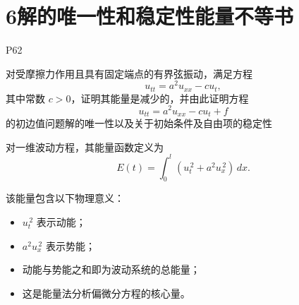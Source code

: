 \section{6解的唯一性和稳定性能量不等书}
P62
\begin{homework}[1]
对受摩擦力作用且具有固定端点的有界弦振动，满足方程
\[
u_{tt}=a^{2}u_{xx}-c u_t,
\]
其中常数 $c>0$，证明其能量是减少的，并由此证明方程
\[
u_{tt}=a^{2}u_{xx}-c u_t+f
\]
的初边值问题解的唯一性以及关于初始条件及自由项的稳定性
\end{homework}
\begin{definition}[波动方程的能量]
对一维波动方程，其能量函数定义为
\[
E(t)=\int_{0}^{l}\left(u_t^{\,2}+a^{2}u_x^{\,2}\right)\,dx.
\]

该能量包含以下物理意义：
\begin{itemize}
    \item $u_t^{\,2}$ 表示动能；
    \item $a^{2}u_x^{\,2}$ 表示势能；
    \item 动能与势能之和即为波动系统的总能量；
    \item 这是能量法分析偏微分方程的核心量。
\end{itemize}
\end{definition}
